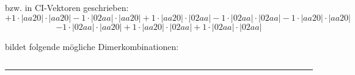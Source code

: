 \documentclass{article}
\begin{document}
\begin{minipage}{\linewidth}
bzw. in CI-Vektoren geschrieben: 
 $$+ 1 \cdot \left|aa20 \right| \cdot \left| aa20 \right| 
- 1 \cdot \left|02aa \right| \cdot \left| aa20 \right| 
+ 1 \cdot \left|aa20 \right| \cdot \left| 02aa \right| 
- 1 \cdot \left|02aa \right| \cdot \left| 02aa \right| 
- 1 \cdot \left|aa20 \right| \cdot \left| aa20 \right| 
 $$ $$ - 1 \cdot \left|02aa \right| \cdot \left| aa20 \right| 
+ 1 \cdot \left|aa20 \right| \cdot \left| 02aa \right| 
+ 1 \cdot \left|02aa \right| \cdot \left| 02aa \right| 
$$



 bildet folgende mögliche Dimerkombinationen:

$$$$



\end{minipage}
\vspace{0.5cm}
\hrule
\vspace{0.5cm}
\end{document}
